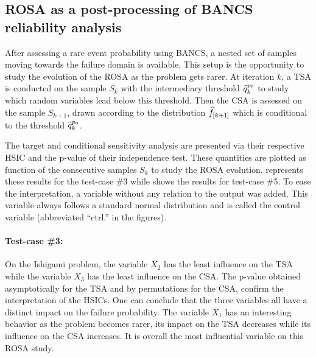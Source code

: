 \subsection{ROSA as a post-processing of BANCS reliability analysis}

After assessing a rare event probability using BANCS, a nested set of samples moving towards the failure domain is available.
This setup is the opportunity to study the evolution of the ROSA as the problem gets rarer.
At iteration $k$, a TSA is conducted on the sample $S_k$ with the intermediary threshold $\widehat{q}^{p_0}_k$ to study which random variables lead below this threshold. 
Then the CSA is assessed on the sample $S_{k+1}$, drawn according to the distribution $\widehat{f}_{[k+1]}$ which is conditional to the threshold $\widehat{q}^{p_0}_k$. 

The target and conditional sensitivity analysis are presented via their respective HSIC and the p-value of their independence test.  
These quantities are plotted as function of the consecutive samples $S_k$ to study the ROSA evolution. 
 represents these results for the test-case \#3 while  shows the results for test-case \#5. 
To ease the interpretation, a variable without any relation to the output was added. 
This variable always follows a standard normal distribution and is called the control variable (abbreviated ``ctrl.'' in the figures). 

\paragraph{Test-case \#3:}
On the Ishigami problem, the variable $X_2$ has the least influence on the TSA while the variable $X_3$ has the least influence on the CSA. 
The p-value obtained asymptotically for the TSA and by permutations for the CSA, confirm the interpretation of the HSICs. 
One can conclude that the three variables all have a distinct impact on the failure probability. 
The variable $X_1$ has an interesting behavior as the problem becomes rarer, its impact on the TSA decreases while its influence on the CSA increases.      
It is overall the most influential variable on this ROSA study.  

